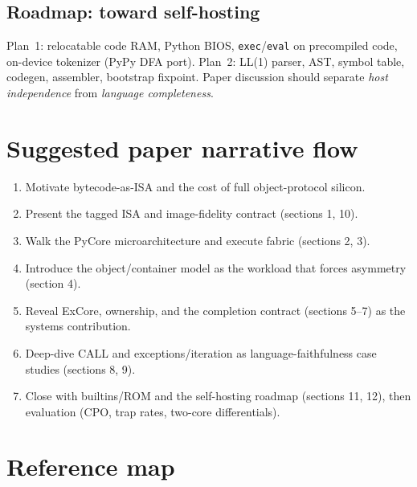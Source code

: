 \documentclass[11pt,a4paper]{article}
\begin{document}
\subsection{Roadmap: toward self-hosting}
Plan~1: relocatable code RAM, Python BIOS, \texttt{exec}/\texttt{eval} on
precompiled code, on-device tokenizer (PyPy DFA port).
Plan~2: LL(1) parser, AST, symbol table, codegen, assembler, bootstrap fixpoint.
Paper discussion should separate \emph{host independence} from
\emph{language completeness}.

\section{Suggested paper narrative flow}

\begin{enumerate}[leftmargin=1.4em,itemsep=0.3em]
  \item Motivate bytecode-as-ISA and the cost of full object-protocol silicon.
  \item Present the tagged ISA and image-fidelity contract (sections 1, 10).
  \item Walk the PyCore microarchitecture and execute fabric (sections 2, 3).
  \item Introduce the object/container model as the workload that forces
        asymmetry (section 4).
  \item Reveal ExCore, ownership, and the completion contract (sections 5--7) as
        the systems contribution.
  \item Deep-dive CALL and exceptions/iteration as language-faithfulness
        case studies (sections 8, 9).
  \item Close with builtins/ROM and the self-hosting roadmap (sections 11, 12),
        then evaluation (CPO, trap rates, two-core differentials).
\end{enumerate}

\section{Reference map}
\end{document}

